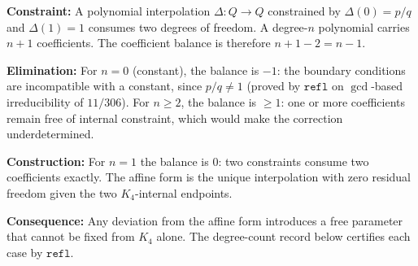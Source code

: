 \documentclass[11pt,a4paper]{book}
\def\mathbb#1{#1}%
\begin{document}
\textbf{Constraint:} A polynomial interpolation $\Delta : \mathbb{Q} \to
\mathbb{Q}$ constrained by $\Delta(0) = p/q$ and $\Delta(1) = 1$ consumes two
degrees of freedom. A degree-$n$ polynomial carries $n + 1$ coefficients. The
coefficient balance is therefore $n + 1 - 2 = n - 1$.

\textbf{Elimination:} For $n = 0$ (constant), the balance is $-1$: the
boundary conditions are incompatible with a constant, since $p/q \neq 1$
(proved by $\mathtt{refl}$ on $\gcd$-based irreducibility of $11/306$). For
$n \geq 2$, the balance is $\geq 1$: one or more coefficients remain free of
internal constraint, which would make the correction underdetermined.

\textbf{Construction:} For $n = 1$ the balance is $0$: two constraints
consume two coefficients exactly. The affine form is the unique
interpolation with zero residual freedom given the two $K_4$-internal
endpoints.

\textbf{Consequence:} Any deviation from the affine form introduces a free
parameter that cannot be fixed from $K_4$ alone. The degree-count record
below certifies each case by $\mathtt{refl}$.
\end{document}
